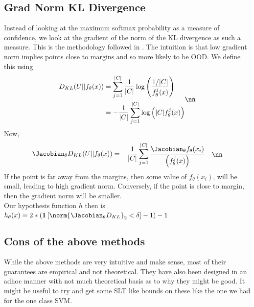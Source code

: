 \documentclass[11pt]{report}
\begin{document}
\subsection{Grad Norm KL Divergence}
Instead of looking at the maximum softmax probability as a measure of confidence, we look at the gradient of the norm of the KL divergence as such a measure. This is the methodology followed in \cite{HuangGengLi2021}. The intuition is that low gradient norm implies points close to margins and so more likely to be OOD. We define this using
\begin{align}
    \begin{aligned}
        D_{KL}(U || f_\theta(x)) &= \sum_{j=1}^{|C|} \frac{1}{|C|} \log \left( \frac{1/|C|}{f_\theta^j(x)} \right)\\
        &= - \frac{1}{|C|} \sum_{j=1}^{|C|}  \log \left( |C|f_\theta^j(x) \right)
    \end{aligned} \nn
\end{align}
Now, 
\begin{align}
    \begin{aligned}
        \Jacobian_\theta D_{KL}(U || f_\theta(x))  &= - \frac{1}{|C|} \sum_{j=1}^{|C|}  \frac{\Jacobian_\theta f_\theta(x_i)}{\left(f_\theta^j(x) \right)}
    \end{aligned} \nn
\end{align}
If the point is far away from the margins, then some value of \(f_\theta(x_i)\), will be small, leading to high gradient norm. Conversely, if the point is close to margin, then the gradient norm will be smaller.\\
Our hypothesis function \(h\) then is \(h_\theta(x)= 2 * \left( \mathbf{1} \left[ \norm{\Jacobian_\theta D_{KL}}_2 < \delta \right] - 1 \right) -1 \)


 

\subsection{Cons of the above methods}
    While the above methods are very intuitive and make sense, most of their guarantees are empirical and not theoretical. They have also been designed in an adhoc manner with not much theoretical basis as to why they might be good. It might be useful to try and get some SLT like bounds on these like the one we had for the one class SVM.




\end{document}

